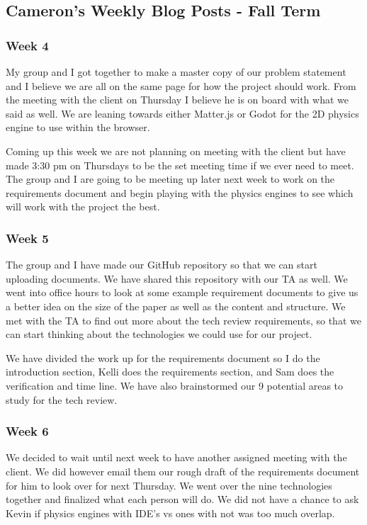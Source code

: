 \subsection{Cameron's Weekly Blog Posts - Fall Term}

\subsubsection{Week 4}
My group and I got together to make a master copy of our problem statement and I believe we are all on the same page for how the project should work. From the meeting with the client on Thursday I believe he is on board with what we said as well. We are leaning towards either Matter.js or Godot for the 2D physics engine to use within the browser. 

Coming up this week we are not planning on meeting with the client but have made 3:30 pm on Thursdays to be the set meeting time if we ever need to meet. The group and I are going to be meeting up later next week to work on the requirements document and begin playing with the physics engines to see which will work with the project the best. 

\subsubsection{Week 5}
The group and I have made our GitHub repository so that we can start uploading documents. We have shared this repository with our TA as well. We went into office hours to look at some example requirement documents to give us a better idea on the size of the paper as well as the content and structure. We met with the TA to find out more about the tech review requirements, so that we can start thinking about the technologies we could use for our project.

We have divided the work up for the requirements document so I do the introduction section, Kelli does the requirements section, and Sam does the verification and time line. We have also brainstormed our 9 potential areas to study for the tech review. 

\subsubsection{Week 6}
We decided to wait until next week to have another assigned meeting with the client. We did however email them our rough draft of the requirements document for him to look over for next Thursday. We went over the nine technologies together and finalized what each person will do.
We did not have a chance to ask Kevin if physics engines with IDE's vs ones with not was too much overlap.

